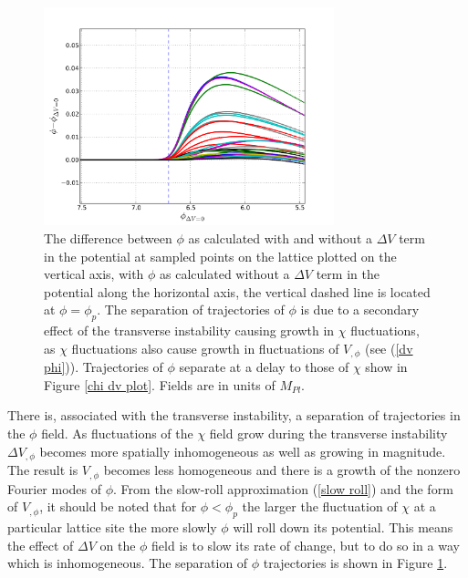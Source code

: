 \documentclass[letterpaper,11pt]{article}
\begin{document}

\begin{figure}
\begin{center}
\includegraphics[width=0.75\textwidth]{phi_dif_plot.png}
\caption{The difference between $\phi$ as calculated with and without a $\Delta V$ term in the potential at sampled points on the lattice plotted on the vertical axis, with $\phi$ as calculated without a $\Delta V$ term in the potential along the horizontal axis, the vertical dashed line is located at $\phi=\phi_p$. The separation of trajectories of $\phi$  is due to a secondary effect of the transverse instability causing growth in $\chi$ fluctuations, as $\chi$ fluctuations also cause growth in fluctuations of $V_{,\phi}$ (see (\ref{dv phi})). Trajectories of $\phi$ separate at a delay to those of $\chi$ show in  Figure \ref{chi dv plot}. Fields are in units of $M_{Pl}$.}
\label{phi dif plot}
\end{center}
\end{figure}

There is, associated with the transverse instability, a separation of trajectories in the $\phi$ field. As fluctuations of the $\chi$ field grow during the transverse instability $\Delta V_{,\phi}$ becomes more spatially inhomogeneous as well as growing in magnitude. The result is $V_{,\phi}$ becomes less homogeneous and there is a growth of the nonzero Fourier modes of $\phi$. From the slow-roll approximation (\ref{slow roll}) and the form of $V_{,\phi}$, it should be noted that for $\phi<\phi_p$ the larger the fluctuation of $\chi$ at a particular lattice site the more slowly $\phi$ will roll down its potential. This means the effect of $\Delta V$ on the $\phi$ field is to slow its rate of change, but to do so in a way which is inhomogeneous. The separation of $\phi$ trajectories is shown in Figure \ref{phi dif plot}.
\end{document}
